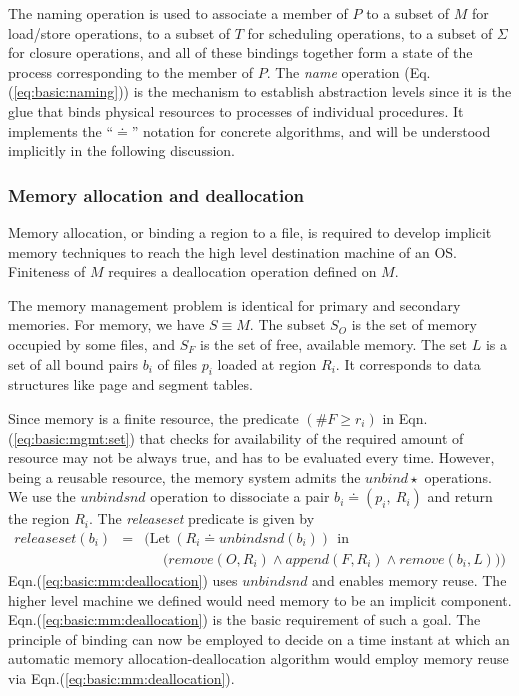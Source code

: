 \documentclass[draft]{article}
\def\names{\doteq}
\def\eqn#1{Eqn.(\ref{#1})}
\begin{document}
The naming operation is used to  associate a member of $P$ to a subset
of $M$  for load/store operations, to  a subset of  $T$ for scheduling
operations, to a subset of $\Sigma$ for closure operations, and all of
these bindings together  form a state of the  process corresponding to
the     member     of      $P$.      The     \emph{name}     operation
(Eq.(\ref{eq:basic:naming})) is the mechanism to establish abstraction
levels since it is the glue that binds physical resources to processes
of individual procedures.  It implements the ``$\names$'' notation for
concrete  algorithms,  and  will   be  understood  implicitly  in  the
following discussion.

\subsubsection{Memory allocation and deallocation}
\label{sec:basic:mm}

Memory  allocation, or  binding a  region to  a file,  is  required to
develop implicit memory techniques to reach the high level destination
machine of an OS.  Finiteness of $M$ requires a deallocation operation
defined on $M$.

The memory  management problem is identical for  primary and secondary
memories.  For memory, we have $S  \equiv M$.  The subset $S_O$ is the
set of  memory occupied by some files,  and $S_F$ is the  set of free,
available memory.   The set $L$ is a  set of all bound  pairs $b_i$ of
files $p_i$ loaded at region $R_i$.  It corresponds to data structures
like page and segment tables.

Since memory  is a finite resource,  the predicate $(\#F  \ge r_i)$ in
\eqn{eq:basic:mgmt:set} that  checks for availability  of the required
amount of  resource may not  be always true,  and has to  be evaluated
every  time.  However, being  a reusable  resource, the  memory system
admits the $unbind\star$ operations.  We use the $unbindsnd$ operation
to dissociate  a pair $b_i \names  (p_i,\ R_i)$ and  return the region
$R_i$.  The \emph{releaseset} predicate is given by
\begin{eqnarray}
  \label{eq:basic:mm:deallocation}
  releaseset(b_i) &=& 
  \biggl(\mathrm{Let}\ (R_i \names unbindsnd(b_i))\  \ \mathrm{in}\ \ 
  \nonumber \\
  &~&\ \ \ \ \ \ \bigl(remove (O, R_i) \wedge append(F, R_i) \wedge
  remove (b_i, L)  \bigr)\biggr)
\end{eqnarray}
\eqn{eq:basic:mm:deallocation}  uses  $unbindsnd$  and enables  memory
reuse.  The higher level machine we defined would need memory to be an
implicit  component.    \eqn{eq:basic:mm:deallocation}  is  the  basic
requirement  of such  a goal.   The principle  of binding  can  now be
employed  to decide on  a time  instant at  which an  automatic memory
allocation-deallocation  algorithm  would   employ  memory  reuse  via
\eqn{eq:basic:mm:deallocation}.
\end{document}
